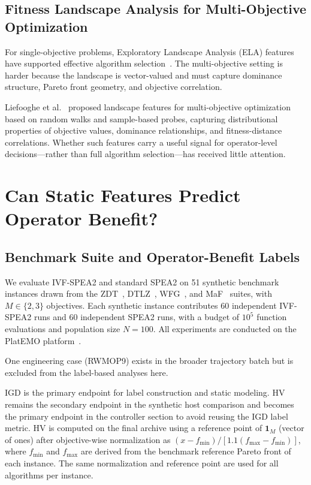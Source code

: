 \documentclass[conference]{IEEEtran}
\begin{document}
\subsection{Fitness Landscape Analysis for Multi-Objective Optimization}
\label{sec:fla_background}

For single-objective problems, Exploratory Landscape Analysis (ELA) features
have supported effective algorithm selection~\cite{kerschke2019automated}.
The multi-objective setting is harder
because the landscape is vector-valued and must capture dominance structure,
Pareto front geometry, and objective correlation.

Liefooghe et al.~\cite{liefooghe2018landscape} proposed landscape features
for multi-objective optimization based on random walks and sample-based
probes, capturing distributional properties of objective values, dominance
relationships, and fitness-distance correlations. Whether such features carry
a useful signal for operator-level decisions---rather than full algorithm
selection---has received little attention.


\section{Can Static Features Predict Operator Benefit?}
\label{sec:fla}

\subsection{Benchmark Suite and Operator-Benefit Labels}
\label{sec:fla_setup}

We evaluate IVF-SPEA2 and standard SPEA2 on 51 synthetic benchmark instances
drawn from the ZDT~\cite{zitzler2000comparison},
DTLZ~\cite{deb2005scalable}, WFG~\cite{huband2006review}, and
MaF~\cite{cheng2017benchmark} suites, with $M \in \{2, 3\}$ objectives.
Each synthetic instance contributes 60 independent IVF-SPEA2 runs and
60 independent SPEA2 runs, with a budget of $10^5$ function evaluations and
population size $N = 100$. All experiments are conducted on the
PlatEMO platform~\cite{tian2017platemo}.

One engineering case (RWMOP9) exists in the broader trajectory batch but is
excluded from the label-based analyses here.

IGD is the primary endpoint for label construction and static modeling. HV
remains the secondary endpoint in the synthetic host comparison and becomes
the primary endpoint in the controller section to avoid reusing the IGD label
metric. HV is computed on the final archive using a reference point of
$\mathbf{1}_M$ (vector of ones) after objective-wise normalization as
$(x - f_{\min})/[1.1(f_{\max} - f_{\min})]$, where $f_{\min}$ and
$f_{\max}$ are derived from the benchmark reference Pareto front
of each instance.
The same normalization and reference point are used for all algorithms
per instance.
\end{document}
